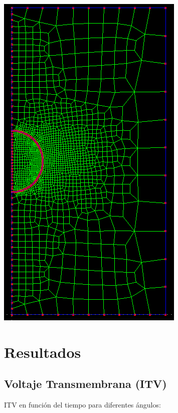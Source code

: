 \documentclass[a0,portrait]{a0poster}
\begin{document}
\begin{multicols}{2}
\begin{multicols}{2}
		\columnbreak
		\begin{center}
			\includegraphics[keepaspectratio, height = 0.18\textheight]{grande} 
		\end{center}

\end{multicols}

\section*{Resultados}

\subsection*{Voltaje Transmembrana (ITV)}
ITV en función del tiempo para diferentes ángulos:


\end{multicols}
\end{document}

